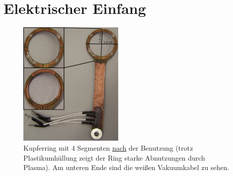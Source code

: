 \documentclass[numbers=noenddot,a4paper,notitlepage,twoside,BCOR15mm]{scrbook}
\begin{document}
		\section{Elektrischer Einfang} \label{sub:einfang}

				\begin{figure}
					\centering
					\includegraphics[width=0.45\textwidth,height=0.58\textwidth]{figs/cam/ringelektrode.jpg}
					\caption{Kupferring mit 4 Segmenten \underline{nach} der Benutzung (trotz Plastikumhüllung zeigt der Ring starke Abnutzungen durch Plasma). Am unteren Ende sind die weißen Vakuumkabel zu sehen.}
					\label{img:ring}
					\vspace{-0.5cm}
				\end{figure}
\end{document}
